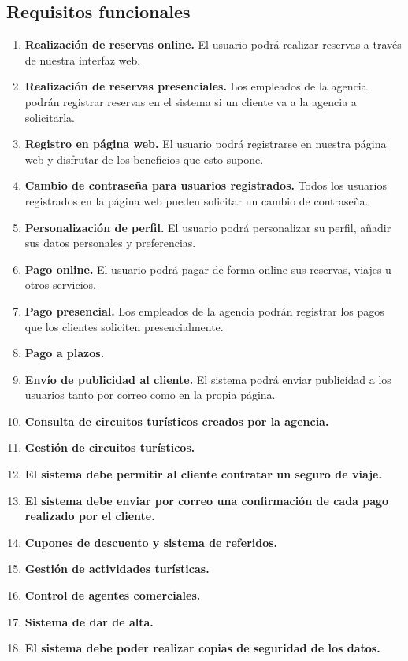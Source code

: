 \documentclass{article}
\begin{document}
	\subsection{Requisitos funcionales}
	\begin{enumerate}
		\item {\bf Realización de reservas online.} El usuario podrá realizar reservas a través de nuestra interfaz web.
		\item {\bf Realización de reservas presenciales.} Los empleados de la agencia podrán registrar reservas en el sistema si un cliente va a la agencia a solicitarla.
		\item {\bf Registro en página web.} El usuario podrá registrarse en nuestra página web y disfrutar de los beneficios que esto supone.
		\item {\bf Cambio de contraseña para usuarios registrados.} Todos los usuarios registrados en la página web pueden solicitar un cambio de contraseña.
		\item {\bf Personalización de perfil.} El usuario podrá personalizar su perfil, añadir sus datos personales y preferencias.
		\item {\bf Pago online.} El usuario podrá pagar de forma online sus reservas, viajes u otros servicios.
		\item {\bf Pago presencial.} Los empleados de la agencia podrán registrar los pagos que los clientes soliciten presencialmente.
		\item {\bf Pago a plazos.}
		\item {\bf Envío de publicidad al cliente.} El sistema podrá enviar publicidad a los usuarios tanto por correo como en la propia página.
		\item {\bf Consulta de circuitos turísticos creados por la agencia.}
		\item {\bf Gestión de circuitos turísticos.}
		\item {\bf El sistema debe permitir al cliente contratar un seguro de viaje.}
		\item {\bf El sistema debe enviar por correo una confirmación de cada pago realizado por el cliente.}
		\item {\bf Cupones de descuento y sistema de referidos.}
		\item {\bf Gestión de actividades turísticas.}
		\item {\bf Control de agentes comerciales.}
		\item {\bf Sistema de dar de alta.}
		\item {\bf El sistema debe poder realizar copias de seguridad de los datos.}
	\end{enumerate}
\end{document}
